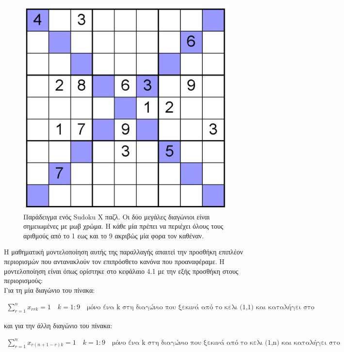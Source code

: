 \documentclass[oneside,12pt]{book}
\theoremstyle{definition}
\begin{document}
\begin{figure}[h]
	\centering
	\includegraphics[scale=1.5]{Figures/sudokuX.jpg}
	\caption{Παράδειγμα ενός Sudoku X παζλ. Οι δύο μεγάλες διαγώνιοι είναι σημειωμένες με μωβ χρώμα. Η κάθε μία πρέπει να περιέχει όλους τους αριθμούς από το 1 εως και το 9 ακριβώς μία φορα τον καθέναν.}
\end{figure}

Η μαθηματική μοντελοποίηση αυτής της παραλλαγής απαιτεί την προσθήκη επιπλέον περιορισμών που αντανακλούν τον επιπρόσθετο κανόνα που προαναφέραμε. Η μοντελοποίηση είναι όπως ορίστηκε στο κεφάλαιο 4.1 με την εξής προσθήκη στους περιορισμούς: \\

Για τη μία διαγώνιο του πίνακα:

\begin{align*}
	\sum_{r=1}^{n} x_{rrk} = 1 \quad k=1:9 \quad \text{μόνο ένα k στη διαγώνιο που ξεκινά από το κελι (1,1) και καταλήγει στο κελι (n,n)}
\end{align*}

και για την άλλη διαγώνιο του πίνακα:

\begin{align*}
\sum_{r=1}^{n} x_{r(n+1-r)k} = 1 \quad k=1:9 \quad \text{μόνο ένα k στη διαγώνιο που ξεκινά από το κελι (1,n) και καταλήγει στο (n,1)}
\end{align*}
\end{document}
